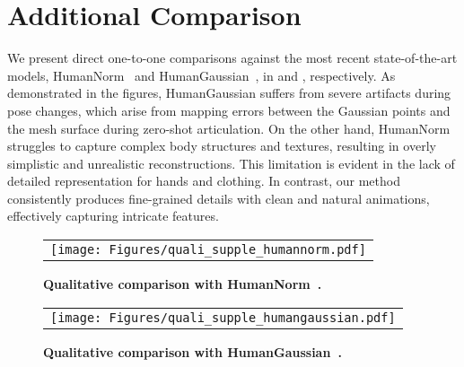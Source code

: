 \section{Additional Comparison}

We present direct one-to-one comparisons against the most recent state-of-the-art models, HumanNorm~\cite{huang2024humannorm} and HumanGaussian~\cite{liu2024humangaussian}, in  and , respectively.
As demonstrated in the figures, HumanGaussian suffers from severe artifacts during pose changes, which arise from mapping errors between the Gaussian points and the mesh surface during zero-shot articulation.
On the other hand, HumanNorm struggles to capture complex body structures and textures, resulting in overly simplistic and unrealistic reconstructions. This limitation is evident in the lack of detailed representation for hands and clothing.
In contrast, our method consistently produces fine-grained details with clean and natural animations, effectively capturing intricate features.

\begin{figure*}[t]
\centering
\begin{tabular}{@{}c}
\texttt{[image: Figures/quali\_supple\_humannorm.pdf]} \\
\end{tabular}
\caption{{\bf Qualitative comparison with HumanNorm~\cite{huang2024humannorm}.}
}
\label{fig:quali_supple_humannorm}
\end{figure*}


\begin{figure*}[t]
\centering
\begin{tabular}{@{}c}
\texttt{[image: Figures/quali\_supple\_humangaussian.pdf]} \\
\end{tabular}
\caption{{\bf Qualitative comparison with HumanGaussian~\cite{liu2024humangaussian}.}
}
\label{fig:quali_supple_humangaussian}
\end{figure*}



